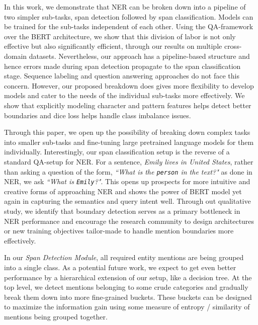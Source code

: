 In this work, we demonstrate that NER can be broken down into a pipeline of two simpler sub-tasks, span detection followed by span classification. Models can be trained for the sub-tasks independent of each other. Using the QA-framework over the BERT architecture, we show that this division of labor is not only effective but also significantly efficient, through our results on multiple cross-domain datasets. Nevertheless, our approach has a pipeline-based structure and hence errors made during span detection propagate to the span classification stage. Sequence labeling and question answering approaches do not face this concern. However, our proposed breakdown does gives more flexibility to develop models and cater to the needs of the individual sub-tasks more effectively. We show that explicitly modeling character and pattern features helps detect better boundaries and dice loss helps handle class imbalance issues.

Through this paper, we open up the possibility of breaking down complex tasks into smaller sub-tasks and fine-tuning large pretrained language models for them individually. Interestingly, our span classification setup is the reverse of a standard QA-setup for NER. For a sentence, \textit{Emily lives in United States}, rather than asking a question of the form, \textit{``What is the \texttt{person} in the text?"} as done in NER, we ask \textit{``What is \texttt{Emily}?"}. This opens up prospects for more intuitive and creative forms of approaching NER and shows the power of BERT model yet again in capturing the semantics and query intent well. Through out qualitative study, we identify that boundary detection serves as a primary bottleneck in NER performance and encourage the research community to design architectures or new training objectives tailor-made to handle mention boundaries more effectively. 
    
In our \textit{Span Detection Module}, all required entity mentions are being grouped into a single class. As a potential future work, we expect to get even better performance by a hierarchical extension of our setup, like a decision tree. At the top level, we detect mentions belonging to some crude categories and gradually break them down into more fine-grained buckets. These buckets can be designed to maximize the information gain using some measure of entropy / similarity of mentions being grouped together.
